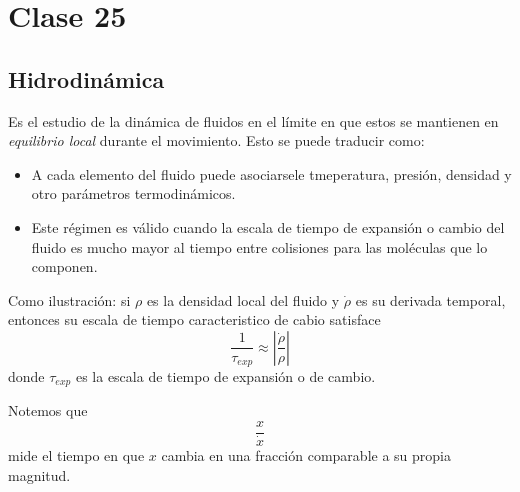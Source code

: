 \section{Clase 25}

\subsection{Hidrodinámica}
Es el estudio de la dinámica de fluidos en el límite en que estos se mantienen en \textit{equilibrio local} durante el movimiento. Esto se puede traducir como:
\begin{itemize}
	\item A cada elemento del fluido puede asociarsele tmeperatura, presión, densidad y otro parámetros termodinámicos.
	\item Este régimen es válido cuando la escala de tiempo de expansión o cambio del fluido es mucho mayor al tiempo entre colisiones para las moléculas que lo componen.
\end{itemize}


Como ilustración: si $\rho$ es la densidad local del fluido y $\dot{\rho}$ es su derivada temporal, entonces su escala de tiempo caracteristico de cabio satisface
\begin{equation}
  \frac{1}{\tau_{exp}}\approx\left|\frac{\dot{\rho}}{\rho}\right|
\end{equation}
donde $\tau_{exp}$ es la escala de tiempo de expansión o de cambio.

Notemos que
\begin{equation}
  \frac{x}{\dot{x}}
\end{equation}
mide el tiempo en que $x$ cambia en una fracción comparable a su propia magnitud.

